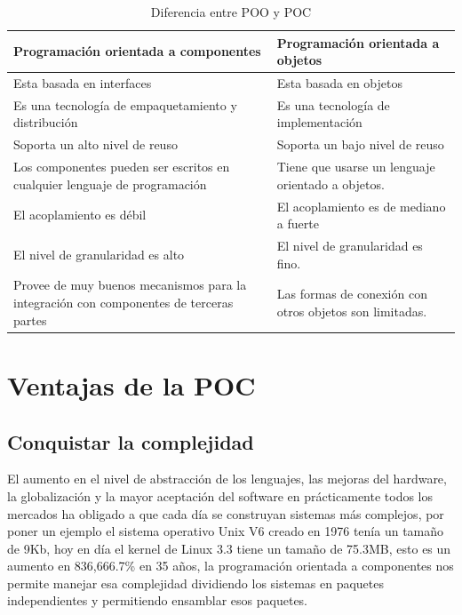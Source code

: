 \documentclass[12pt,a4paper,spanish,openany]{book}
\begin{document}
\singlespacing
\begin{table}[h]
\begin{center}


\begin{tabular}{|p{7cm}|p{7cm}|}
\hline
\textbf{Programación orientada a componentes} & \textbf{Programación orientada a
objetos}\\
\hline
Esta basada en interfaces & Esta basada en objetos \\
\hline
Es una tecnología de empaquetamiento y distribución & Es una tecnología de
implementación \\
\hline
Soporta un alto nivel de reuso & Soporta un bajo nivel de reuso\\
\hline
Los componentes pueden ser escritos en cualquier lenguaje de programación &
Tiene que usarse un lenguaje orientado a objetos.\\
\hline
El acoplamiento es débil & El acoplamiento es de mediano a fuerte\\
\hline
El nivel de granularidad es alto & El nivel de granularidad es fino.\\
\hline
Provee de muy buenos mecanismos para la integración con componentes de terceras
partes & Las formas de conexión con otros objetos son limitadas.\\
\hline


\end{tabular}
\end{center}
\caption{Diferencia entre POO y POC}
\end{table}

\section{Ventajas de la POC}


\subsection{Conquistar la complejidad}
El aumento en el nivel de
abstracción de los lenguajes, las mejoras del hardware, la globalización y la
mayor aceptación del software en prácticamente todos los mercados ha obligado a
que cada día se construyan sistemas más complejos, por poner un ejemplo el
sistema operativo Unix V6 creado en 1976 tenía un tamaño de 9Kb, hoy en día el
kernel de Linux 3.3 tiene un tamaño de 75.3MB, esto es  un aumento en
836,666.7\% en 35 años, la programación orientada a componentes nos permite manejar esa complejidad dividiendo los sistemas en paquetes independientes y permitiendo ensamblar esos
paquetes.
\end{document}
